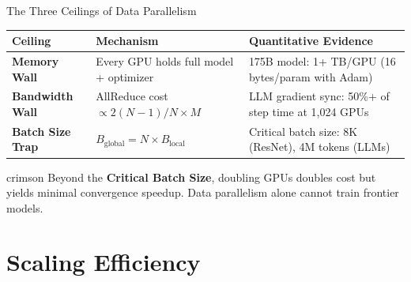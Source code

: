 \documentclass[aspectratio=169, 12pt]{beamer}
\begin{document}
\begin{frame}{The Three Ceilings of Data Parallelism}

\footnotesize
\renewcommand{\arraystretch}{1.15}
\begin{tabular}{@{}lp{3.5cm}p{5.5cm}@{}}
  \toprule
  \textbf{Ceiling} & \textbf{Mechanism} & \textbf{Quantitative Evidence} \\
  \midrule
  \textcolor{errorstroke}{\textbf{Memory Wall}} & Every GPU holds full model + optimizer & 175B model: 1+ TB/GPU (16 bytes/param with Adam) \\
  \textcolor{errorstroke}{\textbf{Bandwidth Wall}} & AllReduce cost $\propto 2(N\!-\!1)/N \times M$ & LLM gradient sync: 50\%+ of step time at 1,024 GPUs \\
  \textcolor{errorstroke}{\textbf{Batch Size Trap}} & $B_{\text{global}} = N \times B_{\text{local}}$ & Critical batch size: 8K (ResNet), 4M tokens (LLMs) \\
  \bottomrule
\end{tabular}

\vspace{0.15cm}
\begin{mlsyscard}{crimson}
{\footnotesize Beyond the \textbf{Critical Batch Size}, doubling GPUs doubles cost but yields minimal convergence speedup. Data parallelism alone cannot train frontier models.}
\end{mlsyscard}

\end{frame}

\section{Scaling Efficiency}
\end{document}

